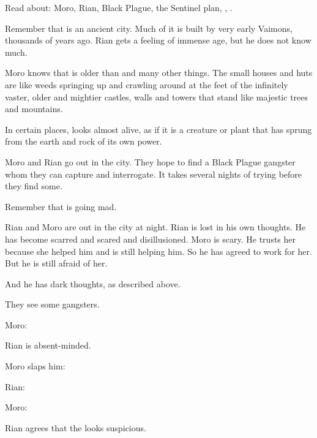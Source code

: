 
Read about: Moro, Rian, Black Plague, the Sentinel plan, \Malcur, .

Remember that \Malcur is an ancient city.
Much of it is built by very early Vaimons, thousands of years ago. 
Rian gets a feeling of immense age, but he does not know much. 

Moro knows that \Malcur is older than \Yormis and many other things. 
The small houses and huts are like weeds springing up and crawling around at the feet of the infinitely vaster, older and mightier castles, walls and towers that stand like majestic trees and mountains. 

In certain places, \Malcur looks almost alive, as if it is a creature or plant that has sprung from the earth and rock of its own power. 



\begin{comment}
  \section{Looking for a victim}
\end{comment}

Moro and Rian go out in the city.
They hope to find a Black Plague gangster whom they can capture and interrogate.
It takes several nights of trying before they find some. 

Remember that \Malcur is going mad. 

Rian and Moro are out in the city at night. 
Rian is lost in his own thoughts. 
He has become scarred and scared and disillusioned.
Moro is scary.
He trusts her because she helped him and is still helping him.
So he has agreed to work for her.
But he is still afraid of her. 

And he has dark thoughts, as described above. 

They see some gangsters.

Moro:

Rian is absent-minded.

Moro slaps him: 

Rian:

Moro:

Rian agrees that the \scatha looks suspicious. 



